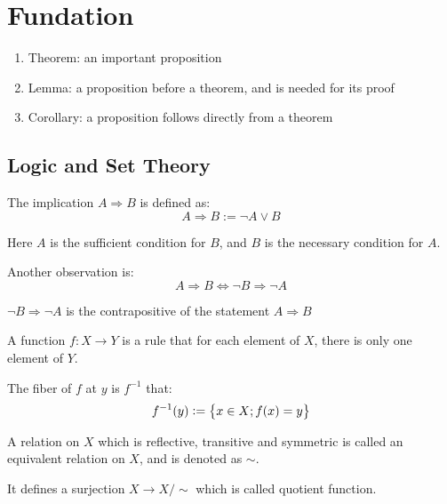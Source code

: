 \chapter{Fundation}


\begin{enumerate}
    \item Theorem: an important proposition
    \item Lemma: a proposition before a theorem, and is needed for its proof
    \item Corollary: a proposition follows directly from a theorem
\end{enumerate}







\section{Logic and Set Theory}


\begin{definition}    
The implication $A \Rightarrow B$ is defined as:
\begin{equation}
    A \Rightarrow B := \neg A \vee B
\end{equation}

Here $A$ is the sufficient condition for $B$, and $B$ is the necessary condition for $A$.

Another observation is:
\begin{equation}
    A \Rightarrow B \Leftrightarrow \neg B \Rightarrow \neg A
\end{equation}

$\neg B \Rightarrow \neg A$ is the contrapositive of the statement $A \Rightarrow B$
\end{definition}

\begin{definition}
    A function $f : X \rightarrow Y$ is a rule that for each element of $X$, there is only one element of $Y$.
\end{definition}

\begin{definition}
    The fiber of $f$ at $y$ is $f^{-1}$ that:
    \begin{equation}
        f^{-1}(y) := \set{x \in X; f(x) = y}
    \end{equation}
\end{definition}

\begin{definition}
    A relation on $X$ which is reflective, transitive and symmetric is called an equivalent relation on $X$, and is denoted as $\sim$.
    
    It defines a surjection $X \rightarrow X / \sim$ which is called quotient function.
\end{definition}



